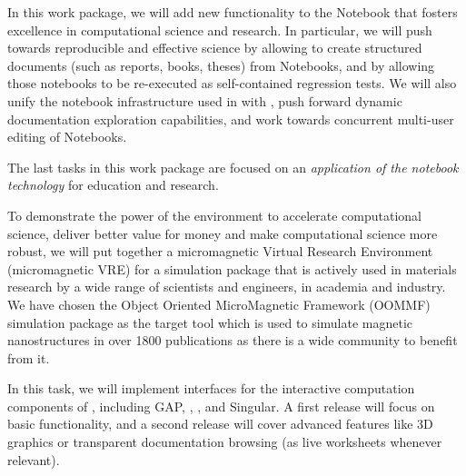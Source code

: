 \begin{workpackage}
\begin{wpdescription}
  In this work package, we will add new functionality to the \Jupyter
  Notebook that fosters excellence in computational science and
  research. In particular, we will push towards reproducible and
  effective science by allowing to create structured documents (such
  as reports, books, theses) from Notebooks, and by allowing those
  notebooks to be re-executed as self-contained regression tests. We
  will also unify the notebook infrastructure used in \Sage with
  \Jupyter, push forward dynamic documentation exploration
  capabilities, and work towards concurrent multi-user editing of
  Notebooks.

  The last tasks in this work package are focused on an
  \emph{application of the \Jupyter notebook technology} for education
  and research.


To demonstrate the power of the \TheProject environment to accelerate
computational science, deliver better value for money and make
computational science more robust, we will put together a micromagnetic
Virtual Research Environment (micromagnetic VRE) for a simulation
package that is actively used in materials research by a wide range of
scientists and engineers, in academia and industry. We have chosen the
Object Oriented MicroMagnetic Framework (OOMMF) simulation package
\cite{OOMMF-url} as the target tool which is used to simulate magnetic
nanostructures in over 1800 publications \cite{OOMMF-citations-url} as
there is a wide community to benefit from it.
\label{page:description-of-micromagnetic-vre}

\end{wpdescription}

\begin{tasklist}
\begin{task}[title=Uniform notebook interface for all interactive components,id=ipython-kernels,lead=PS, partners={SR,USH,USO,LL}]
  In this task, we will implement \Jupyter interfaces for the
  interactive computation components of \TheProject, including GAP,
  \PariGP, \Sage, and Singular. A first release
   will focus on basic functionality,
  and a second release  will cover advanced
  features like 3D graphics or transparent documentation browsing (as
  live worksheets whenever relevant).


\end{task}
\end{tasklist}
\end{workpackage}
